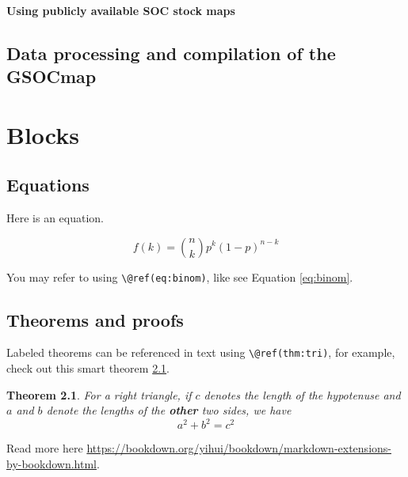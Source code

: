 \documentclass[
  10pt,
  b5paper,
  oneside]{book}
\newtheorem{theorem}{Theorem}[chapter]
\theoremstyle{definition}
\theoremstyle{definition}
\theoremstyle{definition}
\theoremstyle{definition}
\theoremstyle{remark}
\begin{document}
\hypertarget{using-publicly-available-soc-stock-maps}{%
\subsubsection{Using publicly available SOC stock maps}\label{using-publicly-available-soc-stock-maps}}

\hypertarget{data-processing-and-compilation-of-the-gsocmap}{%
\section{Data processing and compilation of the GSOCmap}\label{data-processing-and-compilation-of-the-gsocmap}}

\hypertarget{blocks}{%
\chapter{Blocks}\label{blocks}}

\hypertarget{equations}{%
\section{Equations}\label{equations}}

Here is an equation.

\begin{equation} 
  f\left(k\right) = \binom{n}{k} p^k\left(1-p\right)^{n-k}
  \label{eq:binom}
\end{equation}

You may refer to using \texttt{\textbackslash{}@ref(eq:binom)}, like see Equation \eqref{eq:binom}.

\hypertarget{theorems-and-proofs}{%
\section{Theorems and proofs}\label{theorems-and-proofs}}

Labeled theorems can be referenced in text using \texttt{\textbackslash{}@ref(thm:tri)}, for example, check out this smart theorem \ref{thm:tri}.

\begin{theorem}
\protect\hypertarget{thm:tri}{}\label{thm:tri}For a right triangle, if \(c\) denotes the \emph{length} of the hypotenuse
and \(a\) and \(b\) denote the lengths of the \textbf{other} two sides, we have
\[a^2 + b^2 = c^2\]
\end{theorem}

Read more here \url{https://bookdown.org/yihui/bookdown/markdown-extensions-by-bookdown.html}.
\end{document}
